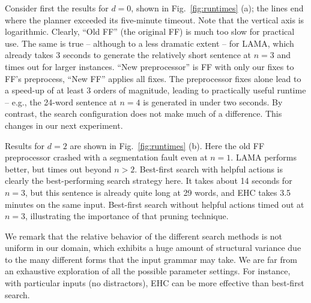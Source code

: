 

Consider first the results for $d=0$, shown in Fig.~\ref{fig:runtimes}
(a); the lines end where the planner exceeded its five-minute
timeout. Note that the vertical axis is logarithmic. Clearly, ``Old
FF'' (the original FF) is much too slow for practical use. The same is
true -- although to a less dramatic extent -- for LAMA, which already
takes $3$ seconds to generate the relatively short sentence at $n=3$ and
times out for larger instances. ``New preprocessor'' is FF with only
our fixes to FF's preprocess, ``New FF'' applies all fixes.
The preprocessor fixes alone lead to a speed-up of at least $3$ orders
of magnitude, leading to practically useful runtime -- e.g., the
24-word sentence at $n=4$ is generated in under two seconds. By
contrast, the search configuration does not make much of a
difference. This changes in our next experiment.

Results for $d=2$ are shown in Fig.~\ref{fig:runtimes} (b).  Here the
old FF preprocessor crashed with a segmentation fault even at
$n=1$. LAMA performs better, but times out beyond $n>2$.  Best-first
search with helpful actions is clearly the best-performing search
strategy here.  It takes about 14 seconds for $n=3$, but this sentence
is already quite long at 29 words, and EHC takes 3.5 minutes on the
same input.  Best-first search without helpful actions timed out at
$n=3$, illustrating the importance of that pruning technique.

We remark that the relative behavior of the different search methods
is not uniform in our domain, which exhibits a huge amount of
structural variance due to the many different forms that the input
grammar may take. We are far from an exhaustive exploration of all the
possible parameter settings. For instance, with particular inputs (no
distractors), EHC can be more effective than best-first search.



